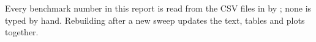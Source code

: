 \begin{titlepage}
\vfill
{\sffamily\footnotesize\color{muted}
Every benchmark number in this report is read from the CSV files in  by
; none is typed by hand. Rebuilding after a new sweep updates the
text, tables and plots together.}
\end{titlepage}
